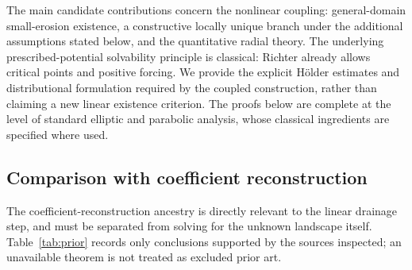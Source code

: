 \documentclass[11pt,a4paper]{article}
\theoremstyle{definition}\newtheorem{definition}[theorem]{Definition}
\theoremstyle{remark}\newtheorem{remark}[theorem]{Remark}
\begin{document}
The main candidate contributions concern the nonlinear coupling: general-domain small-erosion existence, a constructive locally unique branch under the additional assumptions stated below, and the quantitative radial theory. The underlying prescribed-potential solvability principle is classical: Richter already allows critical points and positive forcing. We provide the explicit H\"older estimates and distributional formulation required by the coupled construction, rather than claiming a new linear existence criterion. The proofs below are complete at the level of standard elliptic and parabolic analysis, whose classical ingredients are specified where used.

\subsection*{Comparison with coefficient reconstruction}
The coefficient-reconstruction ancestry is directly relevant to the linear drainage step, and must be separated from solving for the unknown landscape itself. Table~\ref{tab:prior} records only conclusions supported by the
sources inspected; an unavailable theorem is not treated as excluded prior art.
\end{document}

